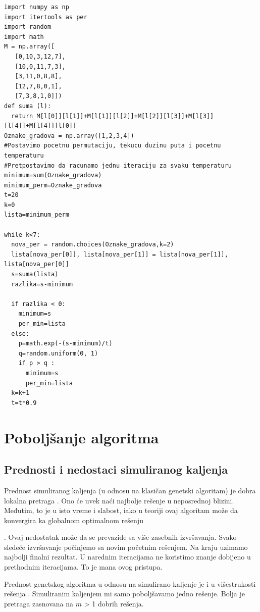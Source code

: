 \documentclass[a4paper]{article}
\begin{document}
\begin{lstlisting}[caption={Rešavanje problema TSP korišćenjem SA algoritma},frame=single, label=simple]
import numpy as np
import itertools as per
import random
import math 
M = np.array([
   [0,10,3,12,7],
   [10,0,11,7,3],
   [3,11,0,8,8],
   [12,7,8,0,1],
   [7,3,8,1,0]])
def suma (l):
  return M[l[0]][l[1]]+M[l[1]][l[2]]+M[l[2]][l[3]]+M[l[3]][l[4]]+M[l[4]][l[0]]
Oznake_gradova = np.array([1,2,3,4])
#Postavimo pocetnu permutaciju, tekucu duzinu puta i pocetnu temperaturu
#Pretpostavimo da racunamo jednu iteraciju za svaku temperaturu
minimum=sum(Oznake_gradova)
minimum_perm=Oznake_gradova
t=20
k=0
lista=minimum_perm

while k<7:
  nova_per = random.choices(Oznake_gradova,k=2)
  lista[nova_per[0]], lista[nova_per[1]] = lista[nova_per[1]], lista[nova_per[0]]
  s=suma(lista)
  razlika=s-minimum
  
  if razlika < 0:
    minimum=s
    per_min=lista
  else:
    p=math.exp(-(s-minimum)/t)
    q=random.uniform(0, 1)
    if p > q :
      minimum=s
      per_min=lista
  k=k+1
  t=t*0.9
\end{lstlisting}






\section{Poboljšanje algoritma}

\subsection{Prednosti i nedostaci simuliranog kaljenja}
Prednost simuliranog kaljenja (u odnosu na klasičan genetski algoritam) je dobra lokalna pretraga \cite{ga_vs_sa_tech_report, gannealingthesis}. Ono će uvek naći najbolje rešenje u neposrednoj blizini. Međutim, to je u isto vreme i slabost, iako u teoriji ovaj algoritam može da konvergira ka globalnom optimalnom rešenju \cite{gannealingthesis} \par.
Ovaj nedostatak može da se prevaziđe sa više zasebnih izvršavanja. Svako sledeće izvršavanje počinjemo sa novim početnim rešenjem. Na kraju uzimamo najbolji finalni rezultat. U narednim iteracijama ne koristimo znanje dobijeno u prethodnim iteracijama. To je mana ovog pristupa. \par
Prednost genetskog algoritma u odnosu na simulirano kaljenje je i u višestrukosti rešenja \cite{gannealingthesis}. Simuliranim kaljenjem mi samo poboljšavamo jedno rešenje. Bolja je pretraga zasnovana na $m$ > 1 dobrih rešenja.
\end{document}
